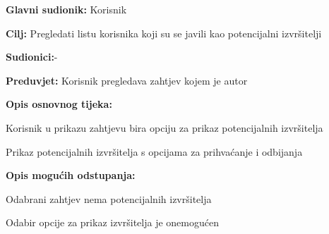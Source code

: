 				
					\noindent {}
					\begin{packed_item}
						
						\item \textbf{Glavni sudionik: }Korisnik
						\item  \textbf{Cilj:} Pregledati listu korisnika koji su se javili kao potencijalni izvršitelji
						\item  \textbf{Sudionici:}-
						\item  \textbf{Preduvjet:} Korisnik pregledava zahtjev kojem je autor
						\item  \textbf{Opis osnovnog tijeka:}
						
						
						\item[] \begin{packed_enum}
							
							\item Korisnik u prikazu zahtjevu bira opciju za prikaz potencijalnih izvršitelja
							\item Prikaz potencijalnih izvršitelja s opcijama za prihvaćanje i odbijanja
						\end{packed_enum}
						
						\item  \textbf{Opis mogućih odstupanja:}
						
						\item[] \begin{packed_item}
							
							\item[2.a] Odabrani zahtjev nema potencijalnih izvršitelja
							\item[] \begin{packed_enum}
								
								\item Odabir opcije za prikaz izvršitelja je onemogućen
								
							\end{packed_enum}
							
						\end{packed_item}
					\end{packed_item}
				
